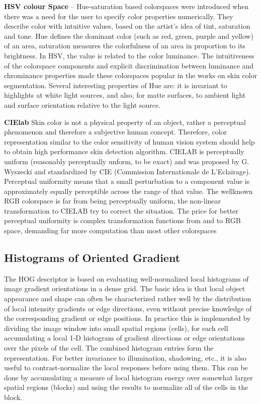 \textbf{HSV colour Space} -- Hue-saturation based colorspaces were introduced when there was a need for the user to specify color properties numerically. They describe color with intuitive values, based on the artist’s idea of tint, saturation and tone. Hue defines the dominant color (such as red, green, purple and yellow) of an area, saturation measures the colorfulness of an area in proportion to its brightness.
In HSV, the value is related to the color luminance. The intuitiveness of the colorspace components and explicit discrimination between luminance and chrominance properties made these colorspaces popular in the works on skin color segmentation. Several interesting properties of Hue are: it is invariant to highlights at white light sources, and also, for matte  surfaces, to ambient light and surface orientation relative to the light source.

\textbf{CIElab} Skin color is not a physical property of an object, rather
a perceptual phenomenon and therefore a subjective human concept.
Therefore, color representation similar to the color sensitivity
of human vision system should help to obtain high performance
skin detection algorithm.
CIELAB is perceptually uniform (reasonably perceptually unform, to be exact) and was proposed
by G. Wyszecki and standardized by CIE (Commission Internationale
de L’Eclairage). Perceptual uniformity means that a small
perturbation to a component value is approximately equally perceptible
across the range of that value. The wellknown
RGB colorspace is far from being perceptually uniform, the
non-linear transformation to CIELAB try to correct
the situation. The price for better perceptual uniformity is complex
transformation functions from and to RGB space, demanding
far more computation than most other colorspaces

\subsection{Histograms of Oriented Gradient}
The HOG descriptor \cite{dalal2005histograms} is based on evaluating well-normalized local histograms of image gradient orientations
in a dense grid. The basic idea is that local object appearance and shape can often be characterized rather well by the distribution of local intensity gradients or edge directions, even without precise knowledge of the corresponding gradient or edge positions. In practice this is implemented by dividing the image window into small spatial regions (cells), for each cell accumulating a local 1-D histogram of gradient directions or edge orientations over the pixels of the cell. The combined histogram entries form the representation. For better invariance to illumination, shadowing, etc., it is also useful to contrast-normalize the local 
responses before using them. This can be done by accumulating a measure of local histogram energy over somewhat
larger spatial regions (blocks) and using the results to normalize all of the cells in the block. 


